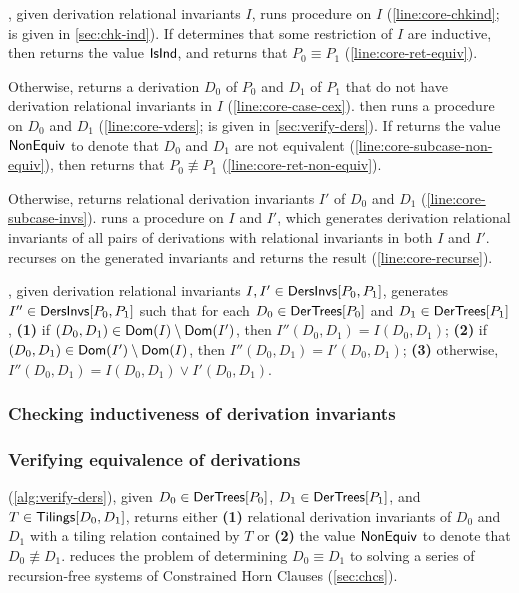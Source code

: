 \verifyaux, given derivation relational invariants $I$, runs procedure
\chkinductive on $I$ (\autoref{line:core-chkind}; 
%
\chkinductive is given in \autoref{sec:chk-ind}).
%
If \chkinductive determines that some restriction of $I$ are
inductive, then \chkinductive returns the value $\mathsf{IsInd}$, and
\verifyaux returns that $P_0 \equiv P_1$
(\autoref{line:core-ret-equiv}).

Otherwise, \chkinductive returns a derivation $D_0$ of $P_0$ and $D_1$
of $P_1$ that do not have derivation relational
invariants in $I$ (\autoref{line:core-case-cex}).
%
\verifyaux then runs a procedure \verifyders on $D_0$ and $D_1$
(\autoref{line:core-vders}; \verifyders is given in
\autoref{sec:verify-ders}).
%
If \verifyders returns the value $\mathsf{NonEquiv}$ to denote that $D_0$ and
$D_1$ are not equivalent (\autoref{line:core-subcase-non-equiv}), then
\verifyaux returns that $P_0 \not\equiv P_1$
(\autoref{line:core-ret-non-equiv}).

Otherwise, \verifyders returns relational derivation invariants $I'$
of $D_0$ and $D_1$ (\autoref{line:core-subcase-invs}).
%
\verifyaux runs a procedure \mergeinvs on $I$ and $I'$, which
generates derivation relational invariants of all pairs of derivations
with relational invariants in both $I$ and $I'$.
%
\verifyaux recurses on the generated invariants and returns the result
(\autoref{line:core-recurse}).

\mergeinvs, given derivation relational invariants $I, I' \in
\mathsf{DersInvs}[ P_0, P_1 ]$, generates $I'' \in \mathsf{DersInvs}[ P_0, P_1 ]$ such
that for each $D_0 \in \mathsf{DerTrees}[ P_0 ]$ and $D_1 \in \mathsf{DerTrees}[ P_1 ]$, %
\textbf{(1)} if $(D_0, D_1) \in \mathsf{Dom}(I) \setminus \mathsf{Dom}(I')$,
then $I''(D_0, D_1) = I(D_0, D_1)$;
%
\textbf{(2)} if $(D_0, D_1) \in \mathsf{Dom}(I') \setminus \mathsf{Dom}(I)$,
then $I''(D_0, D_1) = I'(D_0, D_1)$; %
\textbf{(3)} otherwise, $I''(D_0, D_1) = I(D_0, D_1) \lor I'(D_0,
D_1)$.

\subsubsection{Checking inductiveness of derivation invariants}
\label{sec:chk-ind}

%

\subsubsection{Verifying equivalence of derivations}
\label{sec:verify-ders}
%
\verifyders (\autoref{alg:verify-ders}), given $D_0 \in
\mathsf{DerTrees}[ P_0 ]$, $D_1 \in \mathsf{DerTrees}[ P_1 ]$, and $T \in
\mathsf{Tilings}[ D_0, D_1 ]$, returns either \textbf{(1)} relational derivation
invariants of $D_0$ and $D_1$ with a tiling relation contained by $T$
or %
\textbf{(2)} the value $\mathsf{NonEquiv}$ to denote that $D_0 \not\equiv
D_1$.
%
\verifyders reduces the problem of determining $D_0 \equiv D_1$ to
solving a series of recursion-free systems of Constrained Horn Clauses
(\autoref{sec:chcs}).

